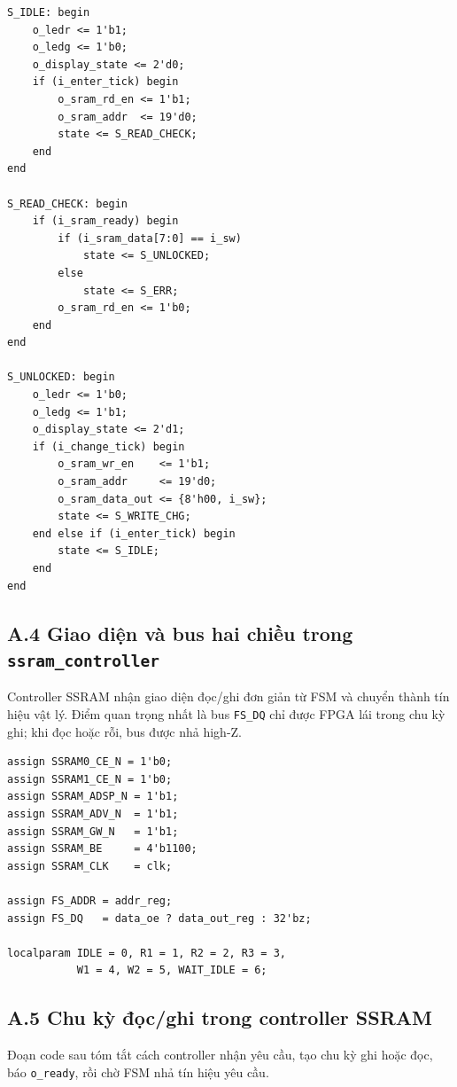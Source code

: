 \documentclass[13pt,a4paper]{article}
\begin{document}
\begin{lstlisting}[style=verilogstyle]
S_IDLE: begin
    o_ledr <= 1'b1;
    o_ledg <= 1'b0;
    o_display_state <= 2'd0;
    if (i_enter_tick) begin
        o_sram_rd_en <= 1'b1;
        o_sram_addr  <= 19'd0;
        state <= S_READ_CHECK;
    end
end

S_READ_CHECK: begin
    if (i_sram_ready) begin
        if (i_sram_data[7:0] == i_sw)
            state <= S_UNLOCKED;
        else
            state <= S_ERR;
        o_sram_rd_en <= 1'b0;
    end
end

S_UNLOCKED: begin
    o_ledr <= 1'b0;
    o_ledg <= 1'b1;
    o_display_state <= 2'd1;
    if (i_change_tick) begin
        o_sram_wr_en    <= 1'b1;
        o_sram_addr     <= 19'd0;
        o_sram_data_out <= {8'h00, i_sw};
        state <= S_WRITE_CHG;
    end else if (i_enter_tick) begin
        state <= S_IDLE;
    end
end
\end{lstlisting}

\subsection*{A.4 Giao diện và bus hai chiều trong \texttt{ssram\_controller}}
Controller SSRAM nhận giao diện đọc/ghi đơn giản từ FSM và chuyển thành tín hiệu vật lý. Điểm quan trọng nhất là bus \texttt{FS\_DQ} chỉ được FPGA lái trong chu kỳ ghi; khi đọc hoặc rỗi, bus được nhả high-Z.

\begin{lstlisting}[style=verilogstyle]
assign SSRAM0_CE_N = 1'b0;
assign SSRAM1_CE_N = 1'b0;
assign SSRAM_ADSP_N = 1'b1;
assign SSRAM_ADV_N  = 1'b1;
assign SSRAM_GW_N   = 1'b1;
assign SSRAM_BE     = 4'b1100;
assign SSRAM_CLK    = clk;

assign FS_ADDR = addr_reg;
assign FS_DQ   = data_oe ? data_out_reg : 32'bz;

localparam IDLE = 0, R1 = 1, R2 = 2, R3 = 3,
           W1 = 4, W2 = 5, WAIT_IDLE = 6;
\end{lstlisting}

\subsection*{A.5 Chu kỳ đọc/ghi trong controller SSRAM}
Đoạn code sau tóm tắt cách controller nhận yêu cầu, tạo chu kỳ ghi hoặc đọc, báo \texttt{o\_ready}, rồi chờ FSM nhả tín hiệu yêu cầu.
\end{document}
